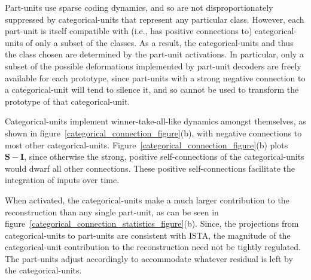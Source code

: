 \documentclass{article} %
\newcommand{\I}{\mathbf{I}}
\newcommand{\Sm}{\mathbf{S}}
\begin{document}
Part-units use sparse coding dynamics, and so are not disproportionately suppressed by categorical-units that represent any particular class.  However, each part-unit is itself compatible with (i.e., has positive connections to) categorical-units of only a subset of the classes.  As a result, the categorical-units and thus the class chosen are determined by the part-unit activations.  In particular, only a subset of the possible deformations implemented by part-unit decoders are freely available for each prototype, since part-units with a strong negative connection to a categorical-unit will tend to silence it, and so cannot be used to transform the prototype of that categorical-unit.

Categorical-units implement winner-take-all-like dynamics amongst themselves, as shown in figure~\ref{categorical_connection_figure}(b), with negative connections to most other categorical-units.  Figure~\ref{categorical_connection_figure}(b) plots $\Sm - \I$, since otherwise the strong, positive self-connections of the categorical-units would dwarf all other connections.  These positive self-connections facilitate the integration of inputs %
over time.



When activated, the categorical-units make a much larger contribution to the reconstruction than any single part-unit, as can be seen in figure~\ref{categorical_connection_statistics_figure}(b).  Since, the projections from categorical-units to part-units are consistent with ISTA, the magnitude of the categorical-unit contribution to the reconstruction need not be tightly regulated.  The part-units adjust accordingly to accommodate whatever residual is left by the categorical-units.
\end{document}
